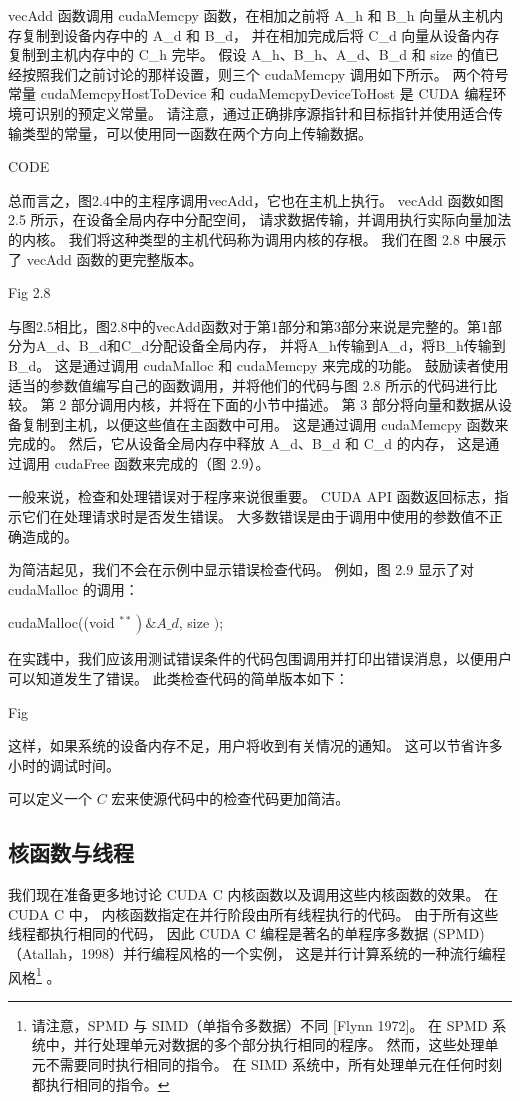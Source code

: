vecAdd 函数调用 cudaMemcpy 函数，在相加之前将 A\_h 和 B\_h 向量从主机内存复制到设备内存中的 A\_d 和 B\_d，
并在相加完成后将 C\_d 向量从设备内存复制到主机内存中的 C\_h 完毕。 
假设 A\_h、B\_h、A\_d、B\_d 和 size 的值已经按照我们之前讨论的那样设置，则三个 cudaMemcpy 调用如下所示。 
两个符号常量 cudaMemcpyHostToDevice 和 cudaMemcpyDeviceToHost 是 CUDA 编程环境可识别的预定义常量。 
请注意，通过正确排序源指针和目标指针并使用适合传输类型的常量，可以使用同一函数在两个方向上传输数据。

{\color{red} CODE}

总而言之，图2.4中的主程序调用vecAdd，它也在主机上执行。 vecAdd 函数如图 2.5 所示，在设备全局内存中分配空间，
请求数据传输，并调用执行实际向量加法的内核。 我们将这种类型的主机代码称为调用内核的存根。 
我们在图 2.8 中展示了 vecAdd 函数的更完整版本。

{\color{red} Fig 2.8}

与图2.5相比，图2.8中的vecAdd函数对于第1部分和第3部分来说是完整的。第1部分为A\_d、B\_d和C\_d分配设备全局内存，
并将A\_h传输到A\_d，将B\_h传输到B\_d。 这是通过调用 cudaMalloc 和 cudaMemcpy 来完成的功能。 
鼓励读者使用适当的参数值编写自己的函数调用，并将他们的代码与图 2.8 所示的代码进行比较。 
第 2 部分调用内核，并将在下面的小节中描述。 第 3 部分将向量和数据从设备复制到主机，以便这些值在主函数中可用。 
这是通过调用 cudaMemcpy 函数来完成的。 然后，它从设备全局内存中释放 A\_d、B\_d 和 C\_d 的内存，
这是通过调用 cudaFree 函数来完成的（图 2.9）。

\begin{remark}
	一般来说，检查和处理错误对于程序来说很重要。 CUDA API 函数返回标志，指示它们在处理请求时是否发生错误。 
	大多数错误是由于调用中使用的参数值不正确造成的。
	
为简洁起见，我们不会在示例中显示错误检查代码。 例如，图 2.9 显示了对 cudaMalloc 的调用：

cudaMalloc((void $\left.{ }^{* *}\right) \& A \_d$, size $)$;

在实践中，我们应该用测试错误条件的代码包围调用并打印出错误消息，以便用户可以知道发生了错误。 此类检查代码的简单版本如下：

{\color{red} Fig}

这样，如果系统的设备内存不足，用户将收到有关情况的通知。 这可以节省许多小时的调试时间。

可以定义一个 $C$ 宏来使源代码中的检查代码更加简洁。
\end{remark}

\subsection{核函数与线程}
我们现在准备更多地讨论 CUDA C 内核函数以及调用这些内核函数的效果。 在 CUDA C 中，
内核函数指定在并行阶段由所有线程执行的代码。 由于所有这些线程都执行相同的代码，
因此 CUDA C 编程是著名的单程序多数据 (SPMD)（Atallah，1998）并行编程风格的一个实例，
这是并行计算系统的一种流行编程风格\footnote{请注意，SPMD 与 SIMD（单指令多数据）不同 [Flynn 1972]。 
在 SPMD 系统中，并行处理单元对数据的多个部分执行相同的程序。 然而，这些处理单元不需要同时执行相同的指令。 
在 SIMD 系统中，所有处理单元在任何时刻都执行相同的指令。} 。

